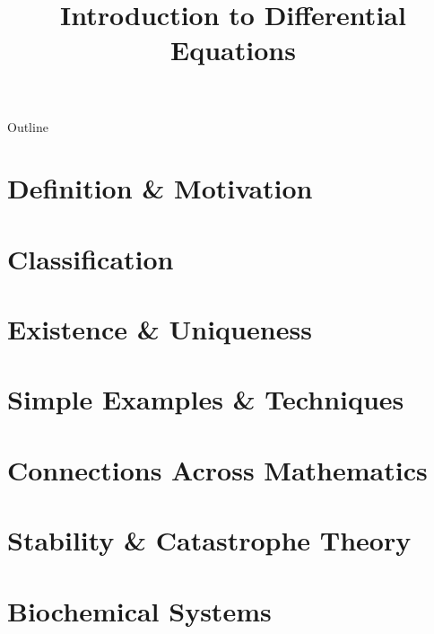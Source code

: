 \documentclass{beamer}
\title{Introduction to Differential Equations}
\author{}
\date{}
\begin{document}
\frame{\titlepage}

\begin{frame}{Outline}
\tableofcontents
\end{frame}

\section{Definition \& Motivation}


\section{Classification}


\section{Existence \& Uniqueness}


\section{Simple Examples \& Techniques}


\section{Connections Across Mathematics}


\section{Stability \& Catastrophe Theory}


\section{Biochemical Systems}

\end{document}
